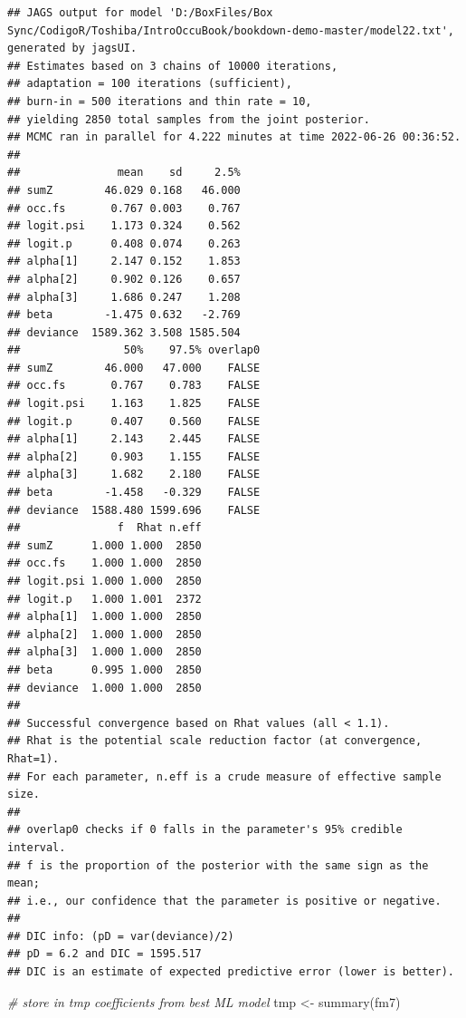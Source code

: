 \documentclass[
]{book}
\newenvironment{Shaded}{\begin{snugshade}}{\end{snugshade}}
\newcommand{\CommentTok}[1]{\textcolor[rgb]{0.56,0.35,0.01}{\textit{#1}}}
\newcommand{\FunctionTok}[1]{\textcolor[rgb]{0.00,0.00,0.00}{#1}}
\newcommand{\NormalTok}[1]{#1}
\newcommand{\OtherTok}[1]{\textcolor[rgb]{0.56,0.35,0.01}{#1}}
\begin{document}
\begin{verbatim}
## JAGS output for model 'D:/BoxFiles/Box Sync/CodigoR/Toshiba/IntroOccuBook/bookdown-demo-master/model22.txt', generated by jagsUI.
## Estimates based on 3 chains of 10000 iterations,
## adaptation = 100 iterations (sufficient),
## burn-in = 500 iterations and thin rate = 10,
## yielding 2850 total samples from the joint posterior. 
## MCMC ran in parallel for 4.222 minutes at time 2022-06-26 00:36:52.
## 
##               mean    sd     2.5%
## sumZ        46.029 0.168   46.000
## occ.fs       0.767 0.003    0.767
## logit.psi    1.173 0.324    0.562
## logit.p      0.408 0.074    0.263
## alpha[1]     2.147 0.152    1.853
## alpha[2]     0.902 0.126    0.657
## alpha[3]     1.686 0.247    1.208
## beta        -1.475 0.632   -2.769
## deviance  1589.362 3.508 1585.504
##                50%    97.5% overlap0
## sumZ        46.000   47.000    FALSE
## occ.fs       0.767    0.783    FALSE
## logit.psi    1.163    1.825    FALSE
## logit.p      0.407    0.560    FALSE
## alpha[1]     2.143    2.445    FALSE
## alpha[2]     0.903    1.155    FALSE
## alpha[3]     1.682    2.180    FALSE
## beta        -1.458   -0.329    FALSE
## deviance  1588.480 1599.696    FALSE
##               f  Rhat n.eff
## sumZ      1.000 1.000  2850
## occ.fs    1.000 1.000  2850
## logit.psi 1.000 1.000  2850
## logit.p   1.000 1.001  2372
## alpha[1]  1.000 1.000  2850
## alpha[2]  1.000 1.000  2850
## alpha[3]  1.000 1.000  2850
## beta      0.995 1.000  2850
## deviance  1.000 1.000  2850
## 
## Successful convergence based on Rhat values (all < 1.1). 
## Rhat is the potential scale reduction factor (at convergence, Rhat=1). 
## For each parameter, n.eff is a crude measure of effective sample size. 
## 
## overlap0 checks if 0 falls in the parameter's 95% credible interval.
## f is the proportion of the posterior with the same sign as the mean;
## i.e., our confidence that the parameter is positive or negative.
## 
## DIC info: (pD = var(deviance)/2) 
## pD = 6.2 and DIC = 1595.517 
## DIC is an estimate of expected predictive error (lower is better).
\end{verbatim}

\begin{Shaded}
\begin{Highlighting}[]
\CommentTok{\# store in tmp coefficients from best ML model}
\NormalTok{tmp }\OtherTok{\textless{}{-}} \FunctionTok{summary}\NormalTok{(fm7)}
\end{Highlighting}
\end{Shaded}
\end{document}
